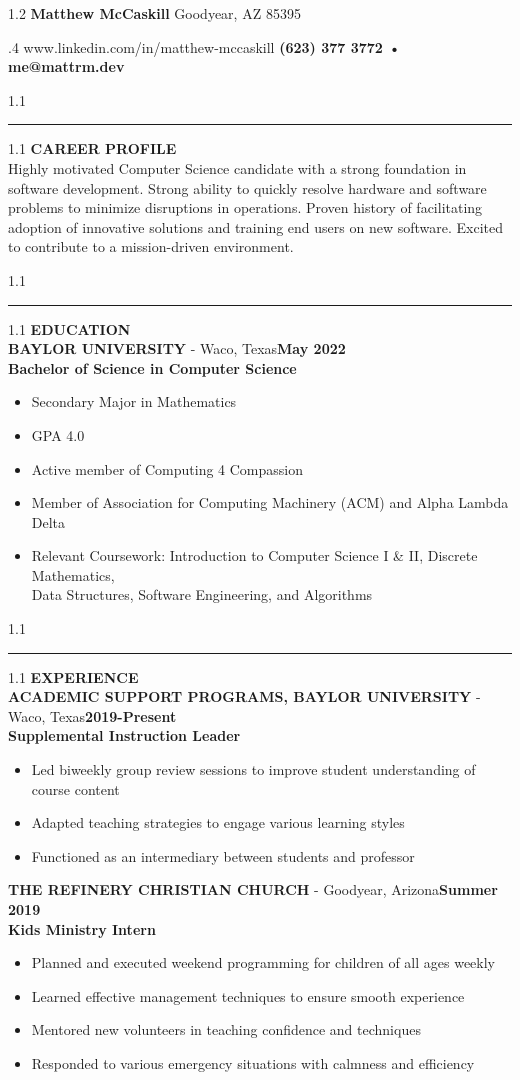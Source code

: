 \documentclass[11pt]{article}
\newcommand*{\resumeheader}[5]{
    \begin{spacing}{1.2}
        \textbf{\huge #1} \hfill #2
    \end{spacing}

    \begin{spacing}{.4}
        #4 \hfill \textbf{#3 • #5}
    \end{spacing}
}
\newcommand{\resumetextcategory}[2]{
    \begin{spacing}{1.1}
        \textbf{\Large \uppercase{#1}}\\
        #2
    \end{spacing}
}
\newenvironment{resumeexperiencecategory}[1]{
    \begin{spacing}{1.1}
        \textbf{\Large \uppercase{#1}}\\
}{
    \end{spacing}
}
\newcommand{\resumeexperience}[5]{
    \textbf{\uppercase {#1}} - #3\hfill \textbf{#4}\\
    \textbf{#2}
    
    \begin{itemize}[topsep=1pt,itemsep=1pt,partopsep=.5pt, parsep=.5pt]
        #5
    \end{itemize}
}
\newcommand*{\resumeseparator}{
    \begin{spacing}{1.1}
        \noindent\rule{\textwidth}{1pt}
    \end{spacing}
}
\begin{document}
	\thispagestyle{empty}
    
    \resumeheader{Matthew McCaskill}{Goodyear, AZ 85395}{(623) 377 3772}{www.linkedin.com/in/matthew-mccaskill}{me@mattrm.dev}
    
    \resumeseparator
    
    \resumetextcategory{Career Profile}{Highly motivated Computer Science candidate with a strong foundation in software development. Strong ability to quickly resolve hardware and software problems to minimize disruptions in operations. Proven history of facilitating adoption of innovative solutions and training end users on new software. Excited to contribute to a mission-driven environment.}

	\resumeseparator
    
    \begin{resumeexperiencecategory}{Education}
        \resumeexperience{Baylor University}{Bachelor of Science in Computer Science}{Waco, Texas}{May 2022}{
            \item Secondary Major in Mathematics
            \item GPA 4.0
            \item Active member of Computing 4 Compassion
            \item Member of Association for Computing Machinery (ACM) and Alpha Lambda Delta
            \item Relevant Coursework: Introduction to Computer Science I \& II, Discrete Mathematics,\\ Data Structures, Software Engineering, and Algorithms
        }
    \end{resumeexperiencecategory}
	
   	\resumeseparator
       
    \begin{resumeexperiencecategory}{Experience}
        \resumeexperience{Academic Support Programs, Baylor University}{Supplemental Instruction Leader}{Waco, Texas}{2019-Present}{
            \item Led biweekly group review sessions to improve student understanding of course content
            \item Adapted teaching strategies to engage various learning styles
            \item Functioned as an intermediary between students and professor
        }
        \resumeexperience{The Refinery Christian Church}{Kids Ministry Intern}{Goodyear, Arizona}{Summer 2019}{
            \item Planned and executed weekend programming for children of all ages weekly
            \item Learned effective management techniques to ensure smooth experience
            \item Mentored new volunteers in teaching confidence and techniques
            \item Responded to various emergency situations with calmness and efficiency
        }
    \end{resumeexperiencecategory}
       
\end{document}
